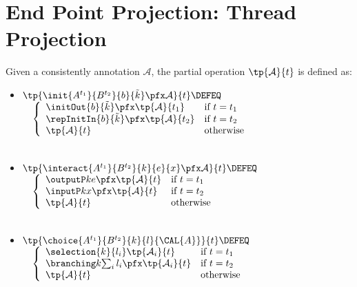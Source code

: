 \section{End Point Projection: Thread Projection}
\label{Logic4Struct:appendix:EPP-thread-proj}

\begin{definition}\label{Logic4Struct:def:tp}\rm 
  Given a consistently annotation $\mathcal{A}$, the
  partial operation $\tp{\mathcal{A}}{t}$ is defined as:
  {\small \begin{itemize}
\item[]
    $\tp{\init {A^{t_1}}{B^{t_2}}{b}{\tilde k}\pfx\mathcal A}{t}
    \DEFEQ$
$  \quad  \left\{ 
      \begin{array}{ll}
        \initOut{b}{\tilde k}\pfx\tp{\mathcal A}{t_1}
        &         
        \textrm{if}\ t=t_1\\
        \repInitIn{b}{\tilde k}\pfx\tp{\mathcal A}{t_2}
        & 
        \textrm{if}\ t=t_2\\
        \tp{\mathcal A}{t}
        & 
        \text{otherwise}
      \end{array}
    \right.
$\\\\

\item[] $\tp{\interact {A^{t_1}}{B^{t_2}}{k}{e}{x} \pfx\mathcal  A}{t}
    \DEFEQ$
$\quad\left\{ 
      \begin{array}{ll}
        \outputP k {e}\pfx\tp{\mathcal A}{t}
       &                 \textrm{if}\ t=t_1
\\
        \inputP k {x}\pfx\tp{\mathcal A}{t}
        & 
        \textrm{if}\ t=t_2\\
        \tp{\mathcal A}{t}
        & 
        \text{otherwise}
      \end{array}
    \right.
$\\\\
\item[] $\tp{\choice {A^{t_1}}{B^{t_2}}{k}{l}{\CAL{A}}}{t}
    \DEFEQ$
$\quad\left\{ 
      \begin{array}{ll}
        \selection {k} {l_i}\tp{\mathcal A_i}{t}
       &                 \textrm{if}\ t=t_1
\\
        \branching k {\sum_i l_i}\pfx\tp{\mathcal A_i}{t}
        & 
        \textrm{if}\ t=t_2\\
        \tp{\mathcal A}{t}
        & 
        \text{otherwise}
      \end{array}
    \right.
$\\\\


\end{itemize}}
\end{definition}
